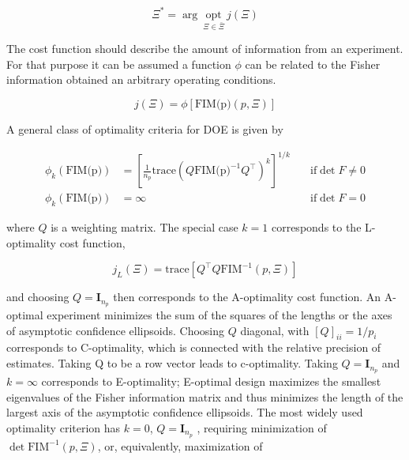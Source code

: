 \documentclass[../Article_Design_of_Experiment.tex]{subfiles}
\begin{document}
	{\footnotesize
	\begin{equation}
		\Xi^* = \arg~\underset{\Xi \in \bar{\Xi}}{\text{opt}}~j\left(\Xi\right)
	\end{equation} }
	
	The cost function should describe the amount of information from an experiment. For that purpose it can be assumed a function $\phi$ can be related to the Fisher information obtained an arbitrary operating conditions.
	
	{\footnotesize
	\begin{equation}
		j(\Xi) = \phi\left[ \text{FIM(p)}(p, \Xi) \right]
	\end{equation} }
	
	
	A general class of optimality criteria for DOE is given by
	
	{\footnotesize
	\begin{align}
		\phi_k(\text{FIM(p)}) &= \left[\frac{1}{n_p} \text{trace}\left( Q\text{FIM(p)}^{-1}Q^\top \right)^k \right]^{1/k} \quad &\text{if} \det F \neq 0 \nonumber \\
		\phi_k(\text{FIM(p)}) &= \infty \quad &\text{if} \det F = 0
	\end{align} }
	
	where $Q$ is a weighting matrix. The special case $k = 1$ corresponds to the L-optimality cost function,
	
	{\footnotesize
	\begin{equation}
		j_L(\Xi) = \text{trace} \left[ Q^\top Q\text{FIM}^{-1}(p,\Xi) \right]
	\end{equation} }
	
	and choosing $Q = \textbf{I}_{n_p}$ then corresponds to the A-optimality cost function. An A-optimal experiment minimizes the sum of the squares of the lengths or the axes of asymptotic confidence ellipsoids. Choosing $Q$ diagonal, with $[Q]_{ii} = 1/p_i$ corresponds to C-optimality, which is connected with the relative precision of estimates. Taking Q to be a row vector leads to c-optimality. Taking $Q = \textbf{I}_{n_p}$ and $k = \infty$ corresponds to E-optimality; E-optimal design maximizes the smallest eigenvalues of the Fisher information matrix and thus minimizes the length of the largest axis of the asymptotic confidence ellipsoids. The most widely used optimality criterion has $k = 0$, $Q = \textbf{I}_{n_p}$ , requiring minimization of $\det \text{FIM}^{-1}(p, \Xi)$, or, equivalently, maximization of
	
\end{document}
